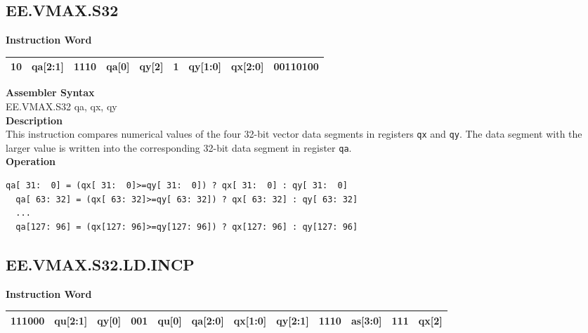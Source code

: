 \clearpage
\subsection{EE.VMAX.S32}\label{instruction:EEVMAXS32}
\setlength\tabcolsep{6pt}
\textbf{Instruction Word} \\
\begin{tabular}{|c|c|c|c|c|c|c|c|c|}
	\hline
	10 & qa[2:1] & 1110 & qa[0] & qy[2] & 1 & qy[1:0] & qx[2:0] & 00110100 \\
	\hline
\end{tabular}

\textbf{Assembler Syntax} \\
EE.VMAX.S32 qa, qx, qy \\
\textbf{Description} \\
This instruction compares numerical values of the four 32-bit vector data segments in registers \lstinline{qx} and \lstinline{qy}. The data segment with the larger value is written into the corresponding 32-bit data segment in register \lstinline{qa}.\\
\textbf{Operation}
\begin{lstlisting}[escapeinside=`?]
  qa[ 31:  0] = (qx[ 31:  0]>=qy[ 31:  0]) ? qx[ 31:  0] : qy[ 31:  0]
  qa[ 63: 32] = (qx[ 63: 32]>=qy[ 63: 32]) ? qx[ 63: 32] : qy[ 63: 32]
  ...
  qa[127: 96] = (qx[127: 96]>=qy[127: 96]) ? qx[127: 96] : qy[127: 96]
\end{lstlisting}

\clearpage
\subsection{EE.VMAX.S32.LD.INCP}\label{instruction:EEVMAXS32LDINCP}
\setlength\tabcolsep{6pt}
\textbf{Instruction Word} \\
\begin{tabular}{|c|c|c|c|c|c|c|c|c|c|c|c|}
	\hline
	111000 & qu[2:1] & qy[0] & 001 & qu[0] & qa[2:0] & qx[1:0] & qy[2:1] & 1110 & as[3:0] & 111 & qx[2] \\
	\hline
\end{tabular}

